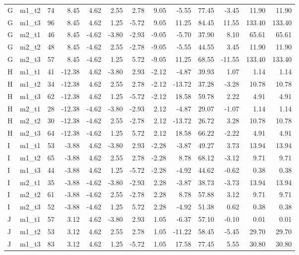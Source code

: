 \documentclass{ltjbook}
\begin{document}
\begin{table}[p]
\begin{tabular}{llrrrrrrrrrrr}
G & m1\_t2 & 74 & 8.45 & 4.62 & 2.55 & 2.78 & 9.05 & -5.55 & 77.45 & -3.45 & 11.90 & 11.90 \\
G & m1\_t3 & 96 & 8.45 & 4.62 & 1.25 & -5.72 & 9.05 & 11.25 & 84.45 & 11.55 & 133.40 & 133.40 \\
G & m2\_t1 & 46 & 8.45 & -4.62 & -3.80 & -2.93 & -9.05 & -5.70 & 37.90 & 8.10 & 65.61 & 65.61 \\
G & m2\_t2 & 48 & 8.45 & -4.62 & 2.55 & -2.78 & -9.05 & -5.55 & 44.55 & 3.45 & 11.90 & 11.90 \\
G & m2\_t3 & 57 & 8.45 & -4.62 & 1.25 & 5.72 & -9.05 & 11.25 & 68.55 & -11.55 & 133.40 & 133.40 \\
H & m1\_t1 & 41 & -12.38 & 4.62 & -3.80 & 2.93 & -2.12 & -4.87 & 39.93 & 1.07 & 1.14 & 1.14 \\
H & m1\_t2 & 34 & -12.38 & 4.62 & 2.55 & 2.78 & -2.12 & -13.72 & 37.28 & -3.28 & 10.78 & 10.78 \\
H & m1\_t3 & 62 & -12.38 & 4.62 & 1.25 & -5.72 & -2.12 & 18.58 & 59.78 & 2.22 & 4.91 & 4.91 \\
H & m2\_t1 & 28 & -12.38 & -4.62 & -3.80 & -2.93 & 2.12 & -4.87 & 29.07 & -1.07 & 1.14 & 1.14 \\
H & m2\_t2 & 30 & -12.38 & -4.62 & 2.55 & -2.78 & 2.12 & -13.72 & 26.72 & 3.28 & 10.78 & 10.78 \\
H & m2\_t3 & 64 & -12.38 & -4.62 & 1.25 & 5.72 & 2.12 & 18.58 & 66.22 & -2.22 & 4.91 & 4.91 \\
I & m1\_t1 & 53 & -3.88 & 4.62 & -3.80 & 2.93 & -2.28 & -3.87 & 49.27 & 3.73 & 13.94 & 13.94 \\
I & m1\_t2 & 65 & -3.88 & 4.62 & 2.55 & 2.78 & -2.28 & 8.78 & 68.12 & -3.12 & 9.71 & 9.71 \\
I & m1\_t3 & 44 & -3.88 & 4.62 & 1.25 & -5.72 & -2.28 & -4.92 & 44.62 & -0.62 & 0.38 & 0.38 \\
I & m2\_t1 & 35 & -3.88 & -4.62 & -3.80 & -2.93 & 2.28 & -3.87 & 38.73 & -3.73 & 13.94 & 13.94 \\
I & m2\_t2 & 61 & -3.88 & -4.62 & 2.55 & -2.78 & 2.28 & 8.78 & 57.88 & 3.12 & 9.71 & 9.71 \\
I & m2\_t3 & 52 & -3.88 & -4.62 & 1.25 & 5.72 & 2.28 & -4.92 & 51.38 & 0.62 & 0.38 & 0.38 \\
J & m1\_t1 & 57 & 3.12 & 4.62 & -3.80 & 2.93 & 1.05 & -6.37 & 57.10 & -0.10 & 0.01 & 0.01 \\
J & m1\_t2 & 53 & 3.12 & 4.62 & 2.55 & 2.78 & 1.05 & -11.22 & 58.45 & -5.45 & 29.70 & 29.70 \\
J & m1\_t3 & 83 & 3.12 & 4.62 & 1.25 & -5.72 & 1.05 & 17.58 & 77.45 & 5.55 & 30.80 & 30.80 \\

\end{tabular}
\end{table}
\end{document}
